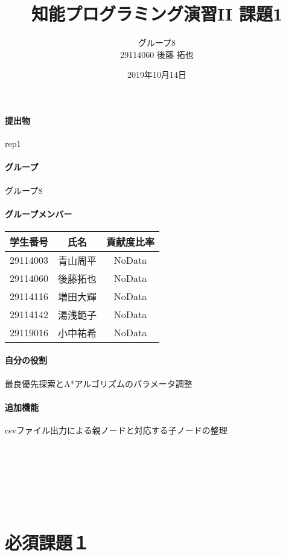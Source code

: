 \documentclass[uplatex,12pt]{jsarticle}
\title{知能プログラミング演習II 課題1}
\author{グループ8\\
  29114060 後藤 拓也\\
}
\date{2019年10月14日}
\begin{document}
\maketitle

\paragraph{提出物} rep1

\paragraph{グループ} グループ8

\paragraph{グループメンバー}
\begin{center}
\begin{tabular}{|c|c|c|}
  \hline
  学生番号&氏名&貢献度比率\\
  \hline\hline
  29114003&青山周平&NoData\\
  \hline
  29114060&後藤拓也&NoData\\
  \hline
  29114116&増田大輝&NoData\\
  \hline
  29114142&湯浅範子&NoData\\
  \hline
  29119016&小中祐希&NoData\\
  \hline
\end{tabular}
\end{center}
\paragraph{自分の役割} 最良優先探索とA*アルゴリズムのパラメータ調整
\paragraph{追加機能} csvファイル出力による親ノードと対応する子ノードの整理
\\\\\\\\\\\\\\
\section{必須課題１}
\end{document}
